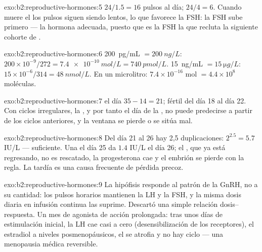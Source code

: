 \begin{solution}{exo:b2:reproductive-hormones:5}
$24/1.5 = 16$ pulsos al día; $24/4 = 6$. Cuando muere el  los
pulsos siguen siendo lentos, lo que favorece la FSH: la FSH sube primero
--- la hormona adecuada, puesto que es la FSH la que recluta la siguiente
cohorte de .
\end{solution}

\begin{solution}{exo:b2:reproductive-hormones:6}
\qty{200}{pg/mL} $= \qty{200}{ng/L}$: $200\times 10^{-9}/272 =
\qty{7.4e-10}{mol/L} = \qty{740}{pmol/L}$. \qty{15}{ng/mL} $=
\qty{15}{\micro g/L}$: $15\times 10^{-6}/314 = \qty{48}{nmol/L}$. En
un microlitro: $7.4\times 10^{-16}$ mol $= 4.4\times 10^{8}$
moléculas.
\end{solution}

\begin{solution}{exo:b2:reproductive-hormones:7}
 el día $35 - 14 = 21$; fértil del día 18 al día 22. Con ciclos
irregulares, la , y por tanto el día de la , no
puede predecirse a partir de los ciclos anteriores, y la ventana se pierde
o se sitúa mal.
\end{solution}

\begin{solution}{exo:b2:reproductive-hormones:8}
Del día 21 al 26 hay 2,5 duplicaciones: $2^{2.5} = 5.7$ IU/L --- suficiente.
Una  el día 25 da $1.4$ IU/L el día 26; el , que ya
está regresando, no es rescatado, la progesterona cae y el embrión se
pierde con la regla. La  tardía es una causa frecuente de
pérdida precoz.
\end{solution}

\begin{solution}{exo:b2:reproductive-hormones:9}
La hipófisis responde al patrón de la GnRH, no a su cantidad: los pulsos
horarios mantienen la LH y la FSH, y la misma dosis diaria en infusión
continua las suprime. Descartó una simple relación dosis--respuesta.
Un mes de agonista de acción prolongada: tras unos días de estimulación
inicial, la LH cae casi a cero (desensibilización de los receptores), el
estradiol a niveles posmenopáusicos, el  se atrofia y no hay
ciclo --- una menopausia médica reversible.
\end{solution}

